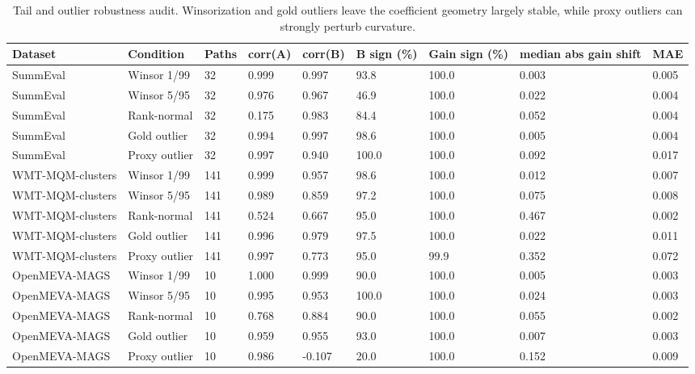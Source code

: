 \begin{table}[t]
\centering
\small
\begin{tabular}{lllllllll}
\toprule
Dataset & Condition & Paths & corr(A) & corr(B) & B sign (\%) & Gain sign (\%) & median abs gain shift & MAE \\
\midrule
SummEval & Winsor 1/99 & 32 & 0.999 & 0.997 & 93.8 & 100.0 & 0.003 & 0.005 \\
SummEval & Winsor 5/95 & 32 & 0.976 & 0.967 & 46.9 & 100.0 & 0.022 & 0.004 \\
SummEval & Rank-normal & 32 & 0.175 & 0.983 & 84.4 & 100.0 & 0.052 & 0.004 \\
SummEval & Gold outlier & 32 & 0.994 & 0.997 & 98.6 & 100.0 & 0.005 & 0.004 \\
SummEval & Proxy outlier & 32 & 0.997 & 0.940 & 100.0 & 100.0 & 0.092 & 0.017 \\
WMT-MQM-clusters & Winsor 1/99 & 141 & 0.999 & 0.957 & 98.6 & 100.0 & 0.012 & 0.007 \\
WMT-MQM-clusters & Winsor 5/95 & 141 & 0.989 & 0.859 & 97.2 & 100.0 & 0.075 & 0.008 \\
WMT-MQM-clusters & Rank-normal & 141 & 0.524 & 0.667 & 95.0 & 100.0 & 0.467 & 0.002 \\
WMT-MQM-clusters & Gold outlier & 141 & 0.996 & 0.979 & 97.5 & 100.0 & 0.022 & 0.011 \\
WMT-MQM-clusters & Proxy outlier & 141 & 0.997 & 0.773 & 95.0 & 99.9 & 0.352 & 0.072 \\
OpenMEVA-MAGS & Winsor 1/99 & 10 & 1.000 & 0.999 & 90.0 & 100.0 & 0.005 & 0.003 \\
OpenMEVA-MAGS & Winsor 5/95 & 10 & 0.995 & 0.953 & 100.0 & 100.0 & 0.024 & 0.003 \\
OpenMEVA-MAGS & Rank-normal & 10 & 0.768 & 0.884 & 90.0 & 100.0 & 0.055 & 0.002 \\
OpenMEVA-MAGS & Gold outlier & 10 & 0.959 & 0.955 & 93.0 & 100.0 & 0.007 & 0.003 \\
OpenMEVA-MAGS & Proxy outlier & 10 & 0.986 & -0.107 & 20.0 & 100.0 & 0.152 & 0.009 \\
\bottomrule
\end{tabular}
\caption{Tail and outlier robustness audit. Winsorization and gold outliers leave the coefficient geometry largely stable, while proxy outliers can strongly perturb curvature.}
\label{tab:tail-outlier-robustness}
\end{table}
